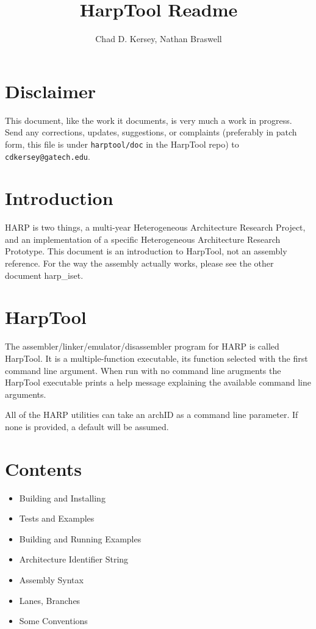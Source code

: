\documentclass[10pt,letterpaper]{article}
\title{HarpTool Readme}
\author{Chad D. Kersey, Nathan Braswell}
\begin{document}
\maketitle
\section*{Disclaimer}
This document, like the work it documents, is very much a work in progress.
Send any corrections, updates, suggestions, or complaints (preferably in patch form, this file is under \texttt{harptool/doc} in the HarpTool repo) to \texttt{cdkersey@gatech.edu}.

\section*{Introduction}
HARP is two things, a multi-year Heterogeneous Architecture Research Project, and an implementation of a specific Heterogeneous Architecture Research Prototype. This document is an introduction to HarpTool, not an assembly reference. For the way the assembly actually works, please see the other document harp\_iset.

\section*{HarpTool}
The assembler/linker/emulator/disassembler program for HARP is called HarpTool.
It is a multiple-function executable, its function selected with the first command line argument.
When run with no command line arugments the HarpTool executable prints a help message explaining the available command line arguments.

All of the HARP utilities can take an archID as a command line parameter.
If none is provided, a default will be assumed.

\section*{Contents}

\begin{itemize}
  \item{Building and Installing}
  \item{Tests and Examples}
  \item{Building and Running Examples}
  \item{Architecture Identifier String}
  \item{Assembly Syntax}
  \item{Lanes, Branches}
  \item{Some Conventions}
\end{itemize}
\end{document}
